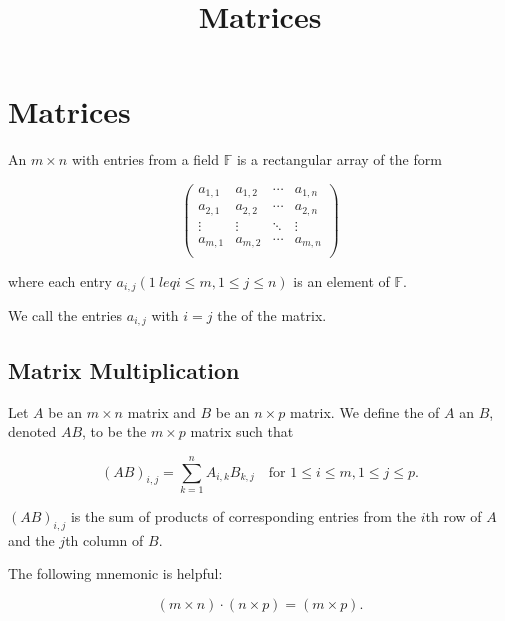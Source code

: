 \documentclass{article}
\title{Matrices}
\begin{document}
\section{Matrices}

\begin{definition}[matrix]
	An $m \times n$  with entries from a \@{field} $\mathbb{F}$ is a \@{rectangular} \@{array} of the form

        \[ \begin{pmatrix}
		a_{1,1} & a_{1,2} & \cdots & a_{1,n} \\
		a_{2,1} & a_{2,2} & \cdots & a_{2,n} \\
		\vdots & \vdots & \ddots & \vdots \\
		a_{m,1} & a_{m,2} & \cdots & a_{m,n} \\
	\end{pmatrix} \]

	where each \@{entry} $a_{i,j} (1 \ leq i \leq m, 1 \leq j \leq n)$ is an \@{element} of $\mathbb{F}.$

	We call the entries $a_{i,j}$ with $i = j$ the  of the matrix.
\end{definition}

\subsection{Matrix Multiplication}

\begin{definition}
	Let $A$ be an $m \times n$ \@{matrix} and $B$ be an $n \times p$ matrix. We define the  of $A$ an $B$, denoted $AB$, to be the $m \times p$ matrix such that

	\[ (AB)_{i,j} = \sum_{k=1}^n A_{i,k} B_{k,j} \quad \text{for } 1 \leq i \leq m, 1 \leq j \leq p. \]
\end{definition}
\begin{note}
	$(AB)_{i,j}$ is the \@{sum} of products of corresponding \@{entries} from the $i$th \@{row} of $A$ and the $j$th \@{column} of $B.$

	The following mnemonic is helpful:

	\[ (m \times n) \cdot (n \times p) = (m \times p). \]
\end{note}
\end{document}
